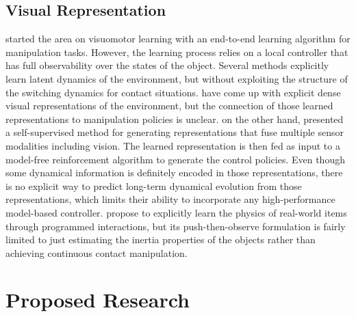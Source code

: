 \documentclass[conference]{IEEEtran}
\begin{document}
\subsection{Visual Representation}
\citet{deep_visuomotor} started the area on visuomotor learning with an end-to-end
learning algorithm for manipulation tasks. However, the learning process relies on a local
controller that has full observability over the states of the object. Several
methods \cite{latent_dynamics, dream_to_control} explicitly learn latent dynamics
of the environment, but without exploiting the structure of the switching dynamics
for contact situations. \citet{dense_objnet} have come up with
explicit dense visual representations of the environment, but the connection of
those learned representations to manipulation policies is unclear. \citet{vision_touch}
on the other hand, presented a self-supervised method for generating representations
that fuse multiple sensor modalities including vision. The learned representation
is then fed as input to a model-free reinforcement algorithm to generate the
control policies. Even though some dynamical information is definitely encoded
in those representations, there is no explicit way to predict long-term dynamical evolution
from those representations, which limits their ability to incorporate any
high-performance model-based controller. \citet{dense_physics} propose to explicitly learn the
physics of real-world items through programmed interactions, but its push-then-observe
formulation is fairly limited to just estimating the inertia properties of the objects
rather than achieving continuous contact manipulation.

\section{Proposed Research}
\end{document}
